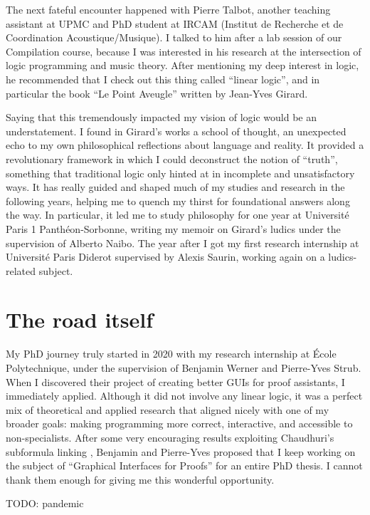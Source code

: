 The next fateful encounter happened with Pierre Talbot, another teaching assistant at UPMC and PhD student at IRCAM (Institut de Recherche et de Coordination Acoustique/Musique). I talked to him after a lab session of our Compilation course, because I was interested in his research at the intersection of logic programming and music theory. After mentioning my deep interest in logic, he recommended that I check out this thing called ``linear logic'', and in particular the book ``Le Point Aveugle'' written by Jean-Yves Girard.

Saying that this tremendously impacted my vision of logic would be an understatement. I found in Girard's works a school of thought, an unexpected echo to my own philosophical reflections about language and reality. It provided a revolutionary framework in which I could deconstruct the notion of ``truth'', something that traditional logic only hinted at in incomplete and unsatisfactory ways. It has really guided and shaped much of my studies and research in the following years, helping me to quench my thirst for foundational answers along the way. In particular, it led me to study philosophy for one year at Université Paris 1 Panthéon-Sorbonne, writing my memoir on Girard's ludics under the supervision of Alberto Naibo. The year after I got my first research internship at Université Paris Diderot supervised by Alexis Saurin, working again on a ludics-related subject.

\section*{The road itself}

My PhD journey truly started in 2020 with my research internship at École Polytechnique, under the supervision of Benjamin Werner and Pierre-Yves Strub. When I discovered their project of creating better GUIs for proof assistants, I immediately applied. Although it did not involve any linear logic, it was a perfect mix of theoretical and applied research that aligned nicely with one of my broader goals: making programming more correct, interactive, and accessible to non-specialists. After some very encouraging results exploiting Chaudhuri's subformula linking \cite{Chaudhuri2013}, Benjamin and Pierre-Yves proposed that I keep working on the subject of ``Graphical Interfaces for Proofs'' for an entire PhD thesis. I cannot thank them enough for giving me this wonderful opportunity.

TODO: pandemic